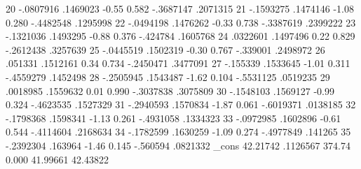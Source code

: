          20  {\VBAR}  -.0807916   .1469023    -0.55   0.582    -.3687147    .2071315
         21  {\VBAR}  -.1593275   .1474146    -1.08   0.280    -.4482548    .1295998
         22  {\VBAR}  -.0494198   .1476262    -0.33   0.738    -.3387619    .2399222
         23  {\VBAR}  -.1321036   .1493295    -0.88   0.376     -.424784    .1605768
         24  {\VBAR}   .0322601   .1497496     0.22   0.829    -.2612438    .3257639
         25  {\VBAR}  -.0445519   .1502319    -0.30   0.767     -.339001    .2498972
         26  {\VBAR}    .051331   .1512161     0.34   0.734    -.2450471    .3477091
         27  {\VBAR}   -.155339   .1533645    -1.01   0.311    -.4559279    .1452498
         28  {\VBAR}  -.2505945   .1543487    -1.62   0.104    -.5531125    .0519235
         29  {\VBAR}   .0018985   .1559632     0.01   0.990    -.3037838    .3075809
         30  {\VBAR}  -.1548103   .1569127    -0.99   0.324    -.4623535    .1527329
         31  {\VBAR}  -.2940593   .1570834    -1.87   0.061    -.6019371    .0138185
         32  {\VBAR}  -.1798368   .1598341    -1.13   0.261    -.4931058    .1334323
         33  {\VBAR}  -.0972985   .1602896    -0.61   0.544    -.4114604    .2168634
         34  {\VBAR}  -.1782599   .1630259    -1.09   0.274    -.4977849     .141265
         35  {\VBAR}  -.2392304    .163964    -1.46   0.145     -.560594    .0821332
             {\VBAR}
       _cons {\VBAR}   42.21742   .1126567   374.74   0.000     41.99661    42.43822
